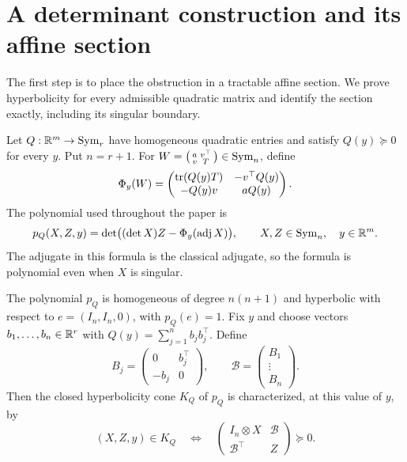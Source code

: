 \section{A determinant construction and its affine section}\label{sec:cone}
The first step is to place the obstruction in a tractable affine
section. We prove hyperbolicity for every admissible quadratic matrix
and identify the section exactly, including its singular boundary.

Let $Q:\mathbb R^m\to\operatorname{Sym}_r$ have homogeneous quadratic entries and satisfy
$Q(y)\succeq0$ for every $y$. Put $n=r+1$. For
$W=\left(\begin{smallmatrix}a&v^\top\\v&T\end{smallmatrix}\right)
\in\operatorname{Sym}_n$, define
\begin{equation}\label{eq:Phi}
 \Phi_y(W)=
 \begin{pmatrix}
  \operatorname{tr}(Q(y)T)&-v^\top Q(y)\\
  -Q(y)v&aQ(y)
 \end{pmatrix}.
\end{equation}
The polynomial used throughout the paper is
\begin{equation}\label{eq:pQ}
 p_Q(X,Z,y)=
 \det\bigl((\det X)Z-\Phi_y(\operatorname{adj}X)\bigr),
 \qquad X,Z\in\operatorname{Sym}_n,\quad y\in\mathbb R^m.
\end{equation}
The adjugate in this formula is the classical adjugate, so the formula
is polynomial even when $X$ is singular.

\begin{proposition}\label{prop:hyperbolic}
The polynomial $p_Q$ is homogeneous of degree $n(n+1)$ and hyperbolic
with respect to $e=(I_n,I_n,0)$, with $p_Q(e)=1$.
Fix $y$ and choose vectors $b_1,\ldots,b_n\in\mathbb R^r$ with
$Q(y)=\sum_{j=1}^n b_jb_j^\top$. Define
\[
 B_j=\begin{pmatrix}0&b_j^\top\\-b_j&0\end{pmatrix},
 \qquad
 \mathcal B=\begin{pmatrix}B_1\\\vdots\\B_n\end{pmatrix}.
\]
Then the closed hyperbolicity cone $K_Q$ of $p_Q$ is characterized,
at this value of $y$, by
\begin{equation}\label{eq:block-cone}
 (X,Z,y)\in K_Q
 \quad\Longleftrightarrow\quad
 \begin{pmatrix}I_n\otimes X&\mathcal B\\
                 \mathcal B^\top&Z\end{pmatrix}\succeq0.
\end{equation}
\end{proposition}

